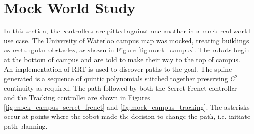 \documentclass[oneside, 11pt]{book}
\begin{document}
\section{Mock World Study}
In this section, the controllers are pitted against one another in a mock real world use case. The University of Waterloo campus map was mocked, treating buildings as rectangular obstacles, as shown in Figure \ref{fig:mock_campus}. The robots begin at the bottom of campus and are told to make their way to the top of campus. An implementation of RRT is used to discover paths to the goal. The spline generated is a sequence of quintic polynomials stitched together preserving $C^2$ continuity as required. The path followed by both the Serret-Frenet controller and the Tracking controller are shown in Figures \ref{fig:mock_campus_serret_frenet} and \ref{fig:mock_campus_tracking}. The asterisks occur at points where the robot made the decision to change the path, i.e. initiate path planning.
\end{document}
